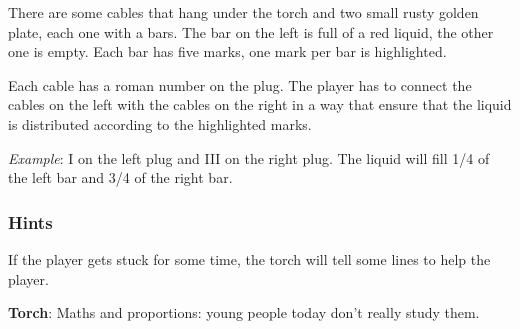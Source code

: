 There are some cables that hang under the torch and two small rusty golden plate, each one with a bars. The bar on the left is full of a red liquid, the other one is empty. Each bar has five marks, one mark per bar is highlighted.

Each cable has a roman number on the plug. The player has to connect the cables on the left with the cables on the right in a way that ensure that the liquid is distributed according to the highlighted marks.

\textit{Example}: I on the left plug and III on the right plug. The liquid will fill 1/4 of the left bar and 3/4 of the right bar.

\subsubsection*{Hints}
If the player gets stuck for some time, the torch will tell some lines to help the player.

\textbf{Torch}: Maths and proportions: young people today don't really study them.
